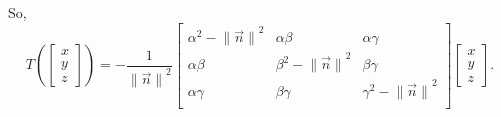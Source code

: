 \documentclass[../hw1]{subfiles}
\begin{document}
So, \[
  T\left( \begin{bmatrix} x\\y\\z  \end{bmatrix}  \right) = -\frac{1}{{\|\vec{n}\|}^2}\begin{bmatrix} \alpha ^{2 }-{\|\vec{n}\|}^2 & \alpha\beta & \alpha\gamma \\ \alpha\beta & \beta^{2 }-{\|\vec{n}\|}^2 & \beta\gamma \\ \alpha\gamma & \beta\gamma & \gamma^{2 }-{\|\vec{n}\|}^2 \\ \end{bmatrix} \begin{bmatrix} x\\y\\z \end{bmatrix}  
.\]
\end{document}
